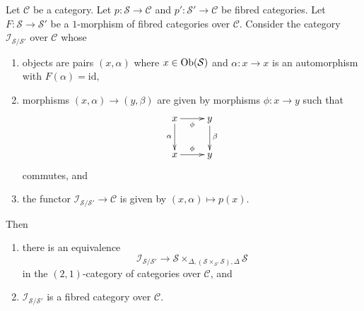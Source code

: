 \begin{lemma}
\label{lemma-inertia-fibred-category}
Let $\mathcal{C}$ be a category. Let
$p : \mathcal{S} \to \mathcal{C}$ and
$p' : \mathcal{S}' \to \mathcal{C}$ be fibred categories.
Let $F : \mathcal{S} \to \mathcal{S}'$ be a $1$-morphism of
fibred categories over $\mathcal{C}$. Consider the category
$\mathcal{I}_{\mathcal{S}/\mathcal{S}'}$ over $\mathcal{C}$ whose
\begin{enumerate}
\item objects are pairs $(x, \alpha)$ where $x \in \mathop{\mathrm{Ob}}\nolimits(\mathcal{S})$
and $\alpha : x \to x$ is an automorphism with $F(\alpha) = \text{id}$,
\item morphisms $(x, \alpha) \to (y, \beta)$ are given by morphisms
$\phi : x \to y$ such that
$$
\xymatrix{
x\ar[r]_\phi\ar[d]_\alpha &
y\ar[d]^{\beta} \\
x\ar[r]^\phi &
y \\
}
$$
commutes, and
\item the functor $\mathcal{I}_{\mathcal{S}/\mathcal{S}'} \to \mathcal{C}$
is given by $(x, \alpha) \mapsto p(x)$.
\end{enumerate}
Then
\begin{enumerate}
\item there is an equivalence
$$
\mathcal{I}_{\mathcal{S}/\mathcal{S}'} \longrightarrow
\mathcal{S}
\times_{\Delta, (\mathcal{S} \times_{\mathcal{S}'} \mathcal{S}), \Delta}
\mathcal{S}
$$
in the $(2, 1)$-category of categories over $\mathcal{C}$, and
\item $\mathcal{I}_{\mathcal{S}/\mathcal{S}'}$ is a fibred category over
$\mathcal{C}$.
\end{enumerate}
\end{lemma}

